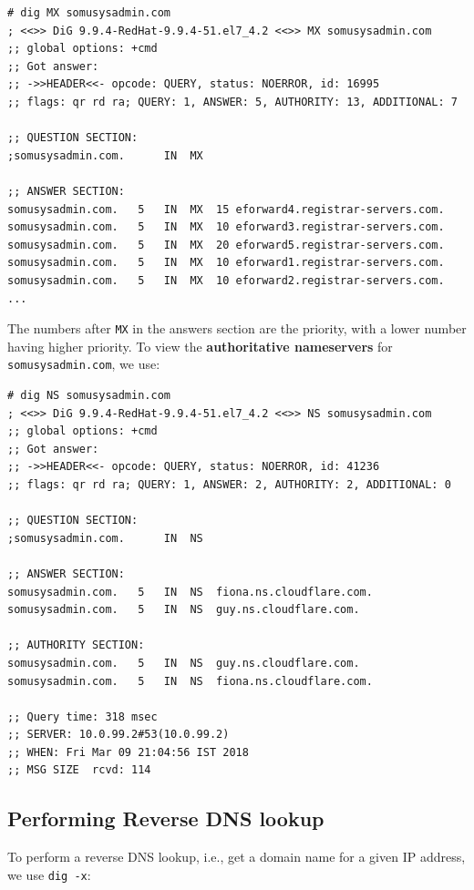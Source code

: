 \vspace{-15pt}
\begin{verbatim}
# dig MX somusysadmin.com
; <<>> DiG 9.9.4-RedHat-9.9.4-51.el7_4.2 <<>> MX somusysadmin.com
;; global options: +cmd
;; Got answer:
;; ->>HEADER<<- opcode: QUERY, status: NOERROR, id: 16995
;; flags: qr rd ra; QUERY: 1, ANSWER: 5, AUTHORITY: 13, ADDITIONAL: 7

;; QUESTION SECTION:
;somusysadmin.com.		IN	MX

;; ANSWER SECTION:
somusysadmin.com.	5	IN	MX	15 eforward4.registrar-servers.com.
somusysadmin.com.	5	IN	MX	10 eforward3.registrar-servers.com.
somusysadmin.com.	5	IN	MX	20 eforward5.registrar-servers.com.
somusysadmin.com.	5	IN	MX	10 eforward1.registrar-servers.com.
somusysadmin.com.	5	IN	MX	10 eforward2.registrar-servers.com.
...
\end{verbatim}
\vspace{-10pt}	

\noindent
The numbers after \verb|MX| in the answers section are the priority, with a lower number having higher priority. To view the \textbf{authoritative nameservers} for \verb|somusysadmin.com|, we use: 

\vspace{-15pt}
\begin{verbatim}
# dig NS somusysadmin.com
; <<>> DiG 9.9.4-RedHat-9.9.4-51.el7_4.2 <<>> NS somusysadmin.com
;; global options: +cmd
;; Got answer:
;; ->>HEADER<<- opcode: QUERY, status: NOERROR, id: 41236
;; flags: qr rd ra; QUERY: 1, ANSWER: 2, AUTHORITY: 2, ADDITIONAL: 0

;; QUESTION SECTION:
;somusysadmin.com.		IN	NS

;; ANSWER SECTION:
somusysadmin.com.	5	IN	NS	fiona.ns.cloudflare.com.
somusysadmin.com.	5	IN	NS	guy.ns.cloudflare.com.

;; AUTHORITY SECTION:
somusysadmin.com.	5	IN	NS	guy.ns.cloudflare.com.
somusysadmin.com.	5	IN	NS	fiona.ns.cloudflare.com.

;; Query time: 318 msec
;; SERVER: 10.0.99.2#53(10.0.99.2)
;; WHEN: Fri Mar 09 21:04:56 IST 2018
;; MSG SIZE  rcvd: 114
\end{verbatim}
\vspace{-10pt}	

\subsection{Performing Reverse DNS lookup}
To perform a reverse DNS lookup, i.e., get a domain name for a given IP address, we use \verb|dig -x|:

